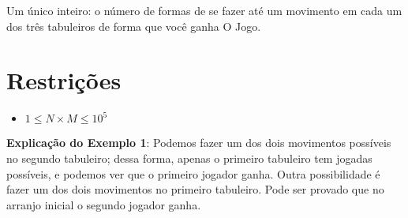 Um único inteiro: o número de formas de se fazer até um movimento em cada um dos três tabuleiros de forma que você ganha O Jogo.


\section*{Restrições}

\begin{itemize}
\item $1 \leq N\times M \leq 10^5$
\end{itemize}

\exemplo

\bigskip
\textbf{Explicação do Exemplo 1}: Podemos fazer um dos dois movimentos possíveis no segundo tabuleiro; dessa forma, apenas o primeiro tabuleiro tem jogadas possíveis, e podemos ver que o primeiro jogador ganha. Outra possibilidade é fazer um dos dois movimentos no primeiro tabuleiro. Pode ser provado que no arranjo inicial o segundo jogador ganha.

